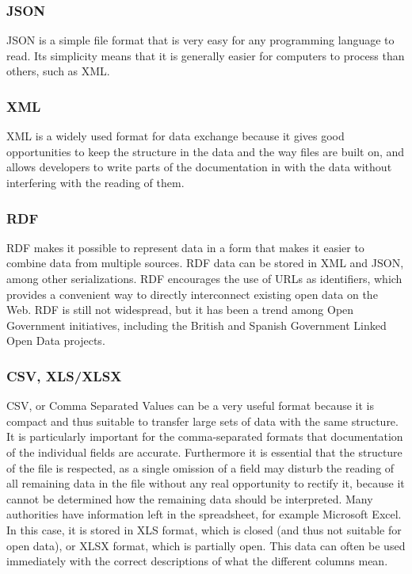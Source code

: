 \documentclass[thesis=B,english]{FITthesis}[2012/06/26]
\begin{document}
	 	\subsubsection*{JSON}
	 	JSON is a simple file format that is very easy for any programming language to read. Its simplicity means that it is generally easier for computers to process than others, such as XML.
	 	\subsubsection*{XML}
	 	XML is a widely used format for data exchange because it gives good opportunities to keep the structure in the data and the way files are built on, and allows developers to write parts of the documentation in with the data without interfering with the reading of them.
	 	\subsubsection*{RDF} 	
		RDF makes it possible to represent data in a form that makes it easier to combine data from multiple sources. RDF data can be stored in XML and JSON, among other serializations. RDF encourages the use of URLs as identifiers, which provides a convenient way to directly interconnect existing open data on the Web. RDF is still not widespread, but it has been a trend among Open Government initiatives, including the British and Spanish Government Linked Open Data projects.
		\subsubsection{CSV, XLS/XLSX}
		CSV, or Comma Separated Values can be a very useful format because it is compact and thus suitable to transfer large sets of data with the same structure. It is particularly important for the comma-separated formats that documentation of the individual fields are accurate.
Furthermore it is essential that the structure of the file is respected, as a single omission of a field may disturb the reading of all remaining data in the file without any real opportunity to rectify it, because it cannot be determined how the remaining data should be interpreted.
Many authorities have information left in the spreadsheet, for example Microsoft Excel. In this case, it is stored in XLS format, which is closed (and thus not suitable for open data), or XLSX format, which is partially open. This data can often be used immediately with the correct descriptions of what the different columns mean.
\end{document}

